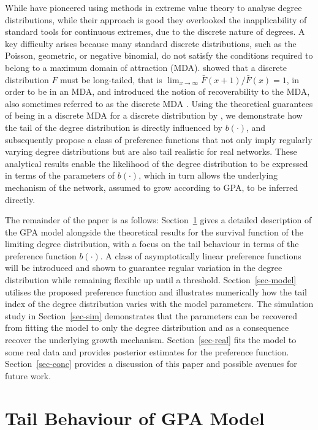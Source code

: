 \documentclass[
  sn-basic,
  10pt,
]{sn-jnl}
\theoremstyle{thmstyleone}
\theoremstyle{thmstyleone}
\theoremstyle{remark}
\theoremstyle{plain}
\theoremstyle{plain}
\theoremstyle{remark}
\begin{document}
While \citet{Voitalov_2019} have pioneered using methods in extreme
value theory to analyse degree distributions, while their approach is
good they overlooked the inapplicability of standard tools for
continuous extremes, due to the discrete nature of degrees. A key
difficulty arises because many standard discrete distributions, such as
the Poisson, geometric, or negative binomial, do not satisfy the
conditions required to belong to a maximum domain of attraction (MDA).
\citet{shimura12} showed that a discrete distribution \(F\) must be
long-tailed, that is
\(\lim_{x\rightarrow\infty}\bar F(x+1)/\bar F(x) = 1\), in order to be
in an MDA, and introduced the notion of recoverability to the MDA, also
sometimes referred to as the discrete MDA \citep{hitz24}. Using the
theoretical guarantees of being in a discrete MDA for a discrete
distribution by \citet{shimura12}, we demonstrate how the tail of the
degree distribution is directly influenced by \(b(\cdot)\), and
subsequently propose a class of preference functions that not only imply
regularly varying degree distributions but are also tail realistic for
real networks. These analytical results enable the likelihood of the
degree distribution to be expressed in terms of the parameters of
\(b(\cdot)\), which in turn allows the underlying mechanism of the
network, assumed to grow according to GPA, to be inferred directly.

The remainder of the paper is as follows: Section~\ref{sec-tail} gives a
detailed description of the GPA model alongside the theoretical results
for the survival function of the limiting degree distribution, with a
focus on the tail behaviour in terms of the preference function
\(b(\cdot)\). A class of asymptotically linear preference functions will
be introduced and shown to guarantee regular variation in the degree
distribution while remaining flexible up until a threshold.
Section~\ref{sec-model} utilises the proposed preference function and
illustrates numerically how the tail index of the degree distribution
varies with the model parameters. The simulation study in
Section~\ref{sec-sim} demonstrates that the parameters can be recovered
from fitting the model to only the degree distribution and as a
consequence recover the underlying growth mechanism.
Section~\ref{sec-real} fits the model to some real data and provides
posterior estimates for the preference function. Section~\ref{sec-conc}
provides a discussion of this paper and possible avenues for future
work.

\section{Tail Behaviour of GPA Model}\label{sec-tail}
\end{document}
